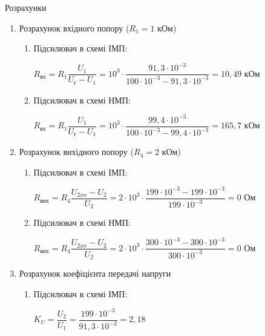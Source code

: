 \documentclass[a4paper,14pt]{extreport}
\begin{document}
\begin{center}
 Розрахунки
\end{center}
\begin{enumerate}
\item Розрахунок вхідного попору ($R_1=1$ кОм)

\begin{enumerate}
\item Підсилювач в схемі ІМП:
\begin{center}
$R_{\text{вх}}=R_1\dfrac{U_1}{U_{\text{г}}-U_1}=10^3\cdot{\dfrac{91,3\cdot{10^{-3}}}{100\cdot{10^{-3}}-91,3\cdot{10^{-3}}}}=10,49$ кОм\\[1cm]
\end{center}

\item Підсилювач в схемі НМП:
\begin{center}
$R_{\text{вх}}=R_1\dfrac{U_1}{U_{\text{г}}-U_1}=10^3\cdot{\dfrac{99,4\cdot{10^{-3}}}{100\cdot{10^{-3}}-99,4\cdot{10^{-3}}}}=165,7$ кОм
\end{center}
\end{enumerate}


\item Розрахунок вихідного попору ($R_4=2$ кОм)

\begin{enumerate}
\item Підсилювач в схемі ІМП:
\begin{center}
$R_{\text{вих}}=R_4\dfrac{U_{2xx}-U_2}{U_2}=2\cdot{10^3} \cdot{\dfrac{199\cdot{10^{-3}}-199\cdot{10^{-3}}}{199\cdot{10^{-3}}}}=0$ Ом\\[1cm]
\end{center}

\item Підсилювач в схемі НМП:
\begin{center}
$R_{\text{вих}}=R_4\dfrac{U_{2xx}-U_2}{U_2}=2\cdot{10^3} \cdot{\dfrac{300\cdot{10^{-3}}-300\cdot{10^{-3}}}{300\cdot{10^{-3}}}}=0$ Ом
\end{center}
\end{enumerate}


\item Розрахунок коефіцієнта передачі напруги

\begin{enumerate}
\item Підсилювач в схемі ІМП:
\begin{center}
$K_U=\dfrac{U_2}{U_1} = \dfrac{199\cdot{10^{-3}}}{91,3\cdot{10^{-3}}}=2,18$\\[1cm]
\end{center}


\end{enumerate}
\end{enumerate}
\end{document}
